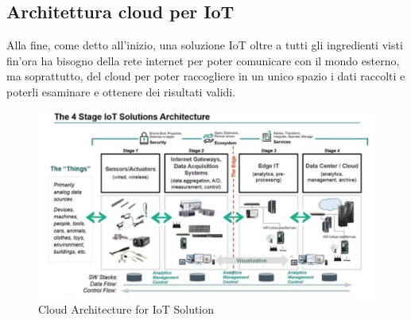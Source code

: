 \documentclass[10pt,a4paper,oneside]{scrbook}
\begin{document}
\subsection{Architettura cloud per IoT}
Alla fine, come detto all'inizio, una soluzione IoT oltre a tutti gli ingredienti visti fin'ora ha bisogno della rete internet per poter comunicare
con il mondo esterno, ma soprattutto, del cloud per poter raccogliere in un unico spazio i dati raccolti e poterli esaminare e ottenere dei risultati validi.
\begin{figure}[h]
    \centering
    \includegraphics[width=0.8\linewidth]{img/arch_iot.png}
    \caption{Cloud Architecture for IoT Solution}
    \label{fig:Cloud Architecture for IoT Solution}
\end{figure}
\end{document}

